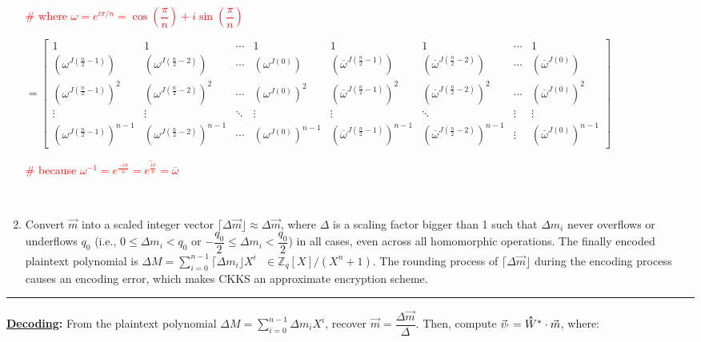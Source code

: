 \begin{tcolorbox}[title={\textbf{\tboxlabel{\ref*{subsec:ckks-encoding-decoding}} CKKS's Encoding and Decoding}}]
\begin{enumerate}
\textcolor{red}{ \# where $\omega = e^{i\pi/n} = \cos \left(\dfrac{\pi}{n}\right) + i\sin \left(\dfrac{\pi}{n}\right)$}

\small{\noindent $ = \begin{bmatrix}
1 & 1 & \cdots & 1 & 1 & 1 & \cdots & 1\\
(\omega^{J(\frac{n}{2} - 1)}) & (\omega^{J(\frac{n}{2} - 2)}) & \cdots & (\omega^{J(0)}) & (\overline\omega^{J(\frac{n}{2} - 1)}) & (\overline\omega^{J(\frac{n}{2} - 2)}) & \cdots & (\overline\omega^{J(0)})\\
(\omega^{J(\frac{n}{2} - 1)})^2 & (\omega^{J(\frac{n}{2} - 2)})^2 & \cdots & (\omega^{J(0)})^2 & (\overline\omega^{J(\frac{n}{2} - 1)})^2 & (\overline\omega^{J(\frac{n}{2} - 2)})^2 & \cdots & (\overline\omega^{J(0)})^2 \\
\vdots & \vdots & \ddots & \vdots & \vdots & \ddots & \vdots & \vdots \\
(\omega^{J(\frac{n}{2} - 1)})^{n-1} & (\omega^{J(\frac{n}{2} - 2)})^{n-1} & \cdots & (\omega^{J(0)})^{n-1} & (\overline\omega^{J(\frac{n}{2} - 1)})^{n-1} & (\overline\omega^{J(\frac{n}{2} - 2)})^{n-1} & \vdots  & (\overline\omega^{J(0)})^{n-1}
\end{bmatrix}$}

\textcolor{red}{ \# because $\omega^{-1} = e^{\frac{-i\pi}{n}} = \overline{e^{\frac{i\pi}{n}}} = \overline\omega$}

$ $

\item Convert $\vec{m}$ into a scaled integer vector $\lceil \Delta\vec{m} \rfloor \approx \Delta \vec{m}$, where $\Delta$ is a scaling factor bigger than 1 such that $\Delta m_i$ never overflows or underflows $q_0$ (i.e., $0 \leq \Delta m_i < q_0$ or $-\dfrac{q_0}{2} \leq \Delta m_i < \dfrac{q_0}{2}$) in all cases, even across all homomorphic operations. The finally encoded plaintext polynomial is $\Delta M = \sum\limits_{i=0}^{n-1} \lceil \Delta m_i \rfloor X^i \text{ } \in \mathbb{Z}_q[X] / (X^n + 1)$. The rounding process of $\lceil \Delta \vec{m} \rfloor$ during the encoding process causes an encoding error, which makes CKKS an approximate encryption scheme. 

\end{enumerate}

\par\noindent\rule{\textwidth}{0.4pt}

\textbf{\underline{Decoding}: } From the plaintext polynomial $\Delta M = \sum\limits_{i=0}^{n-1}$$\Delta m_iX^i$, recover $\vec{m} = \dfrac{\Delta \vec{m}}{\Delta}$. Then,
compute $\vec{v}_{'} = \hathat W^* \cdot \vec{m}$, where:


\end{tcolorbox}
